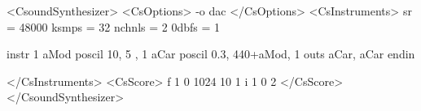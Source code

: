 <CsoundSynthesizer>
<CsOptions>
-o dac
</CsOptions>
<CsInstruments>
sr = 48000
ksmps = 32
nchnls = 2
0dbfs = 1

instr 1
aMod poscil 10, 5 , 1 
aCar poscil 0.3, 440+aMod, 1
outs aCar, aCar
endin

</CsInstruments>
<CsScore>
f 1 0 1024 10 1 
i 1 0 2
</CsScore>
</CsoundSynthesizer>
